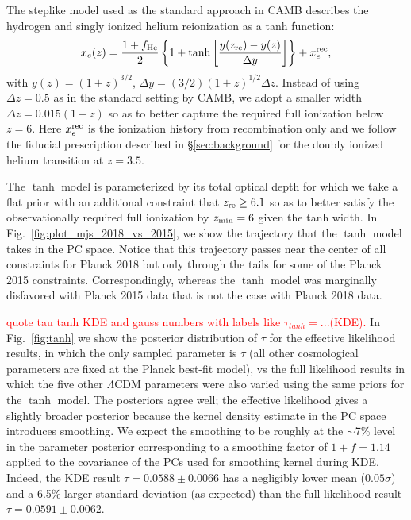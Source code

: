 \documentclass[prd,twocolumn,amsmath,amssymb,floatfix,superscriptaddress,nofootinbib]{revtex4-1}
\newcommand{\reffig}[1]{Fig.~\ref{fig:#1}}
\newcommand{\zre}{z_{\rm re}}
\newcommand{\ch}[1]{\textcolor{red}{#1}}
\begin{document}
The steplike model used as the standard approach in CAMB describes the hydrogen and singly ionized helium reionization as a tanh function:
%
 \begin{equation}
x_e(z) = \frac{1+f_{\rm He}}{2}\left\{  1+ \tanh\left[ \frac{y(z_{\rm re})-y(z)}{\Delta y} \right] \right\} + x_e^{\rm rec},
 \label{eqn:tanh_1D}
 \end{equation}
 with $y(z)=(1+z)^{3/2}$, $\Delta y=(3/2)(1+z)^{1/2}\Delta z$. Instead of using $\Delta z = 0.5$ as in the standard setting by CAMB, we adopt a smaller width $\Delta z = 0.015(1+z)$ so as to better capture the required full ionization below $z=6$. Here $x_e^{\rm rec}$ is the ionization history from recombination only and we follow the fiducial prescription described in \S \ref{sec:background} for the 
 doubly ionized helium transition at $z=3.5$.
 

The $\tanh$ model is parameterized by its total optical depth for which we take a flat prior 
with an additional constraint that $z_{\rm re}\ge 6.1$ so as to better satisfy the observationally required full ionization by $z_{\rm min}=6$ given the tanh width.
In Fig.~\ref{fig:plot_mjs_2018_vs_2015}, we show the trajectory that the $\tanh$ model takes in the PC space. Notice that this trajectory passes near the center of all constraints for Planck 2018 but only through the tails for some of the Planck 2015 constraints.  Correspondingly, whereas the $\tanh$ model was marginally disfavored with Planck 2015 data that is not the case with Planck 2018 data. 

 
\ch{quote tau tanh KDE and gauss numbers with labels like $\tau_{tanh} = ... $(KDE).}
In \reffig{tanh} we show the posterior distribution of $\tau$ for the effective likelihood results, in which the only sampled parameter is $\tau$ (all other cosmological parameters are fixed at the Planck best-fit model), vs the full likelihood results in which the five other $\Lambda$CDM parameters were also varied using the same priors for the $\tanh$ model.
The posteriors agree well; the effective likelihood gives a slightly broader posterior because the kernel density estimate in the PC space introduces smoothing. We expect the smoothing to be roughly at the $\sim$7\% level in the parameter posterior corresponding to a smoothing factor of $1+f = 1.14$ applied to the covariance of the PCs used for smoothing kernel during KDE. Indeed, the KDE result $\tau = 0.0588 \pm 0.0066$ has a negligibly lower mean ($0.05\sigma$) and a 6.5\% larger standard deviation (as expected) than the full likelihood result $\tau = 0.0591 \pm 0.0062$.
\end{document}
